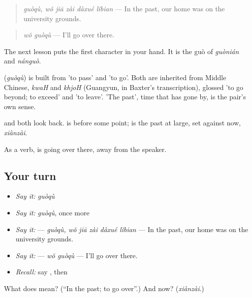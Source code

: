 \begin{quote}
\textbf{ } \emph{guòqù, wǒ jiā zài dàxué lǐbian} — In the past, our home was on the university grounds.
\end{quote}

\begin{quote}
\textbf{} \emph{wǒ guòqù} — I'll go over there.
\end{quote}

The next lesson puts the first character in your hand. It is the guò of \emph{guònián} and \emph{nánguò}.

\begin{cousinweb}
\textbf{} (\emph{guòqù}) is built from  'to pass' and  'to go'. Both are inherited from Middle Chinese, \emph{kwaH} and \emph{khjoH} (Guangyun, in Baxter's transcription), glossed 'to go beyond; to exceed' and 'to leave'. 'The past', time that has gone by, is the pair's own sense.
\end{cousinweb}

\begin{grammarlens}[title={What you've built}]
 and  both look back.  is before some point;  is the past at large, set against now, \emph{xiànzài}.

As a verb,  is going over there, away from the speaker.
\end{grammarlens}

\subsection*{Your turn}
\begin{itemize}
\raggedright
  \item \emph{Say it:} \emph{guòqù}
  \item \emph{Say it:} \emph{guòqù}, once more
  \item \emph{Say it:}   — \emph{guòqù, wǒ jiā zài dàxué lǐbian} — In the past, our home was on the university grounds.
  \item \emph{Say it:}  — \emph{wǒ guòqù} — I'll go over there.
  \item \emph{Recall:} say , then 
\end{itemize}

\begin{tcolorbox}[breakable,colback=teal!4,colframe=teal!35!black,title={Before you move on}]
What does  mean? (\textquotedblleft{}In the past; to go over\textquotedblright{}.) And now? (\emph{xiànzài}.)
\end{tcolorbox}
